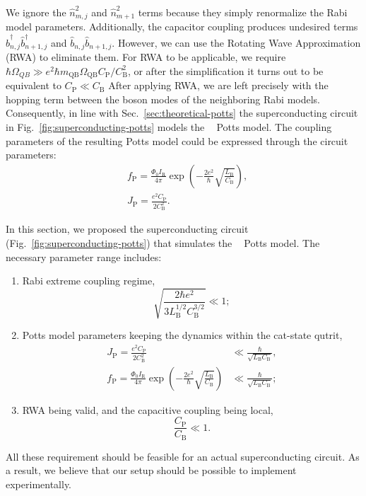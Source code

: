 \documentclass[reprint, aps, prx, amsmath, amssymb, longbibliography, superscriptaddress]{revtex4-2}
\DeclareMathOperator{\Zthree}{\mathbb{Z}_3}
\begin{document}
We ignore the $ \hat n_{m,j}^2 $ and $ \hat n_{m+1}^2 $ terms because they simply renormalize the Rabi model parameters. Additionally, the capacitor coupling produces undesired terms $\hat b^{\dagger}_{n,j} \hat b^{\dagger}_{n+1,j}$ and $\hat b_{n,j} \hat b_{n+1,j}$. However, we can use the Rotating Wave Approximation (RWA) to eliminate them. For RWA to be applicable, we require $\hbar\Omega_{QB} \gg e^2\hbar m_{\text{QB}}\Omega_{\text{QB}}C_{\text{P}}/C_{\text{B}}^2$, or after the simplification it turns out to be equivalent to $C_{\text{P}} \ll C_{\text{B}}$ After applying RWA, we are left precisely with the hopping term between the boson modes of the neighboring Rabi models. Consequently, in line with Sec.~\ref{sec:theoretical-potts} the superconducting circuit in Fig.~\ref{fig:superconducting-potts} models the $\Zthree$ Potts model. The coupling parameters of the resulting Potts model could be expressed through the circuit parameters:
\begin{equation}
\begin{aligned}
    &f_{\text{P}} = \frac{\Phi_0I_{\text{R}}}{4\pi} \exp\left(-\frac{2e^2}{\hbar}\sqrt{\frac{L_{\text{B}}}{C_{\text{B}}}}\right), \\
    &J_{\text{P}} = \frac{e^2 C_{\text{P}}}{2C_{\text{B}}^2}. 
\end{aligned}
\end{equation}

In this section, we proposed the superconducting circuit (Fig.~\ref{fig:superconducting-potts}) that simulates the $\Zthree$ Potts model. The necessary parameter range includes: 
\begin{enumerate}[label=(\roman*)]
    \item Rabi extreme coupling regime, 
    \begin{equation}
    \tag{\theequation .A}
    \sqrt{\frac{2\hbar e^2}{3L^{1/2}_{\text{B}}C^{3/2}_{\text{B}}}} \ll 1;
    \end{equation}
    \item Potts model parameters keeping the dynamics within the cat-state qutrit, 
    \begin{equation}
    \tag{\theequation .B}
    \begin{aligned}J_{\text{P}}=\frac{e^2 C_{\text{P}}}{2C_{\text{B}}^2}&\ll \frac{\hbar}{\sqrt{L_{\text{B}}C_{\text{B}}}}, \\
    f_{\text{P}} = \frac{\Phi_0I_{\text{R}}}{4\pi} \exp\left(-\frac{2e^2}{\hbar}\sqrt{\frac{L_{\text{B}}}{C_{\text{B}}}}\right) &\ll \frac{\hbar}{\sqrt{L_{\text{B}}C_{\text{B}}}};
    \end{aligned}
    \end{equation}
    \item RWA being valid, and the capacitive coupling being local, 
    \begin{equation}
    \tag{\theequation .C}
    \frac{C_{\text{P}}}{C_{\text{B}}} \ll 1.
    \end{equation}
\end{enumerate} 
All these requirement should be feasible for an actual superconducting circuit. As a result, we believe that our setup should be possible to implement experimentally.
\end{document}
